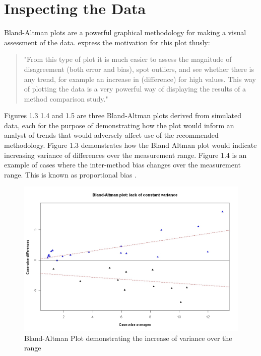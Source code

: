 \documentclass[12pt, a4paper]{report}
\theoremstyle{plain}
\theoremstyle{definition}
\theoremstyle{remark}
\begin{document}
	\section{Inspecting the Data}
	Bland-Altman plots are a powerful graphical methodology for making
	a visual assessment of the data. \citet*{BA83} express the
	motivation for this plot thusly:
	\begin{quote}
		"From this type of plot it is much easier to assess the magnitude
		of disagreement (both error and bias), spot outliers, and see
		whether there is any trend, for example an increase in
		(difference) for high values. This way of plotting the data is a
		very powerful way of displaying the results of a method comparison
		study."
	\end{quote}
	
	
	Figures 1.3 1.4 and 1.5 are three Bland-Altman plots derived from
	simulated data, each for the purpose of demonstrating how the plot
	would inform an analyst of trends that would adversely affect use
	of the recommended methodology. Figure 1.3 demonstrates how the
	Bland Altman plot would indicate increasing variance of
	differences over the measurement range. Figure 1.4 is an example
	of cases where the inter-method bias changes over the measurement
	range. This is known as proportional bias \citep{ludbrook97}.
	
	
	\begin{figure}[h!]
		\begin{center}
			\includegraphics[width=125mm]{images/BAFanEffect.jpeg}
			\caption{Bland-Altman Plot demonstrating the increase of variance over the range}\label{BAFanEffect}
		\end{center}
	\end{figure}
	
\end{document}
